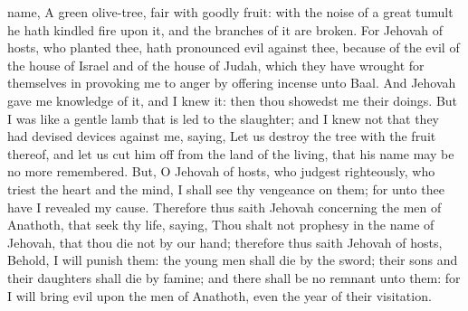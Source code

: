 name, A green olive-tree, fair with goodly fruit: with the noise of a great tumult he hath kindled fire upon it, and the branches of it are broken. For Jehovah of hosts, who planted thee, hath pronounced evil against thee, because of the evil of the house of Israel and of the house of Judah, which they have wrought for themselves in provoking me to anger by offering incense unto Baal.  And Jehovah gave me knowledge of it, and I knew it: then thou showedst me their doings. But I was like a gentle lamb that is led to the slaughter; and I knew not that they had devised devices against me, saying, Let us destroy the tree with the fruit thereof, and let us cut him off from the land of the living, that his name may be no more remembered. But, O Jehovah of hosts, who judgest righteously, who triest the heart and the mind, I shall see thy vengeance on them; for unto thee have I revealed my cause. Therefore thus saith Jehovah concerning the men of Anathoth, that seek thy life, saying, Thou shalt not prophesy in the name of Jehovah, that thou die not by our hand; therefore thus saith Jehovah of hosts, Behold, I will punish them: the young men shall die by the sword; their sons and their daughters shall die by famine; and there shall be no remnant unto them: for I will bring evil upon the men of Anathoth, even the year of their visitation. 

